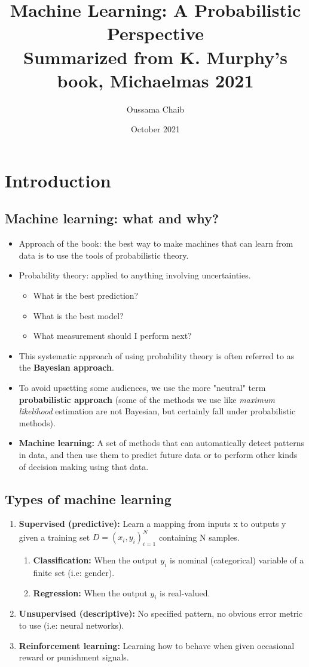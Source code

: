 \documentclass[a4paper,11pt]{article}
\title{%
	Machine Learning: A Probabilistic Perspective \\
	\vspace{10pt}
	\small Summarized from K. Murphy's book, Michaelmas 2021}
\author{\small Oussama Chaib}
\date{\small October 2021}
\begin{document}
	\maketitle
	\tableofcontents
	\pagebreak
	\section{Introduction}
	\subsection{Machine learning: what and why?}
	\begin{itemize}
		\item Approach of the book: the best way to make machines that can learn from data is to use the tools of probabilistic theory.
		\item Probability theory: applied to anything involving uncertainties.
		\begin{itemize}
			\item What is the best prediction?
			\item What is the best model?
			\item What measurement should I perform next?
		\end{itemize}
		\item This systematic approach of using probability theory is often referred to as the \textbf{Bayesian approach}.
		\item To avoid upsetting some audiences, we use the more "neutral" term \textbf{probabilistic approach} (some of the methods we use like \textit{maximum likelihood} estimation are not Bayesian, but certainly fall under probabilistic methods).
		\item \textbf{Machine learning:} A set of methods that can automatically detect patterns in data, and then use them to predict future data or to perform other kinds of decision making using that data.
	\end{itemize}

\subsection{Types of machine learning}
\begin{enumerate}
	\item \textbf{Supervised (predictive):} Learn a mapping from inputs x to outputs y given a training set $D={(x_i,y_i)}_{i=1}^N$ containing N samples.
	\begin{enumerate}
		\item \textbf{Classification:} When the output $y_i$ is nominal (categorical) variable of a finite set (i.e: gender).
		\item \textbf{Regression:} When the output $y_i$ is real-valued.
	\end{enumerate}
	\item \textbf{Unsupervised (descriptive):} No specified pattern, no obvious error metric to use (i.e: neural networks).
	\item \textbf{Reinforcement learning:} Learning how to behave when given occasional reward or punishment signals.
\end{enumerate}
\end{document}
